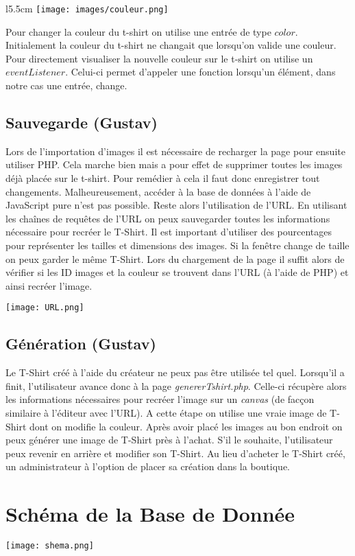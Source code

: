 \documentclass[french]{article}
\begin{document}
\begin{wrapfigure}{l}{5.5cm}
\texttt{[image: images/couleur.png]}
\end{wrapfigure} 

Pour changer la couleur du t-shirt on utilise une entrée de type $color$. Initialement la couleur du t-shirt ne changait que lorsqu'on valide une couleur. Pour directement visualiser la nouvelle couleur sur le t-shirt on utilise un $eventListener$. Celui-ci permet d'appeler une fonction lorsqu'un élément, dans notre cas une entrée, change.

\clearpage
\newpage

\subsection{Sauvegarde (Gustav)}

Lors de l'importation d'images il est nécessaire de recharger la page pour ensuite utiliser PHP. Cela marche bien mais a pour effet de supprimer toutes les images déjà placée sur le t-shirt. Pour remédier à cela il faut donc enregistrer tout changements. Malheureusement, accéder à la base de données à l'aide de JavaScript pure n'est pas possible. Reste alors l'utilisation de l'URL. En utilisant les cha\^{i}nes de requ\^{e}tes de l'URL on peux sauvegarder toutes les informations n\'{e}cessaire pour recr\'{e}er le T-Shirt. Il est important d'utiliser des pourcentages pour repr\'{e}senter les tailles et dimensions des images. Si la fen\^{e}tre change de taille on peux garder le m\^{e}me T-Shirt. Lors du chargement de la page il suffit alors de vérifier si les ID images et la couleur se trouvent dans l'URL (\`{a} l'aide de PHP) et ainsi recréer l'image.

\begin{center}
    \texttt{[image: URL.png]}
\end{center}

\subsection{G\'{e}n\'{e}ration (Gustav)}

Le T-Shirt créé à l'aide du créateur ne peux pas être utilisée tel quel. Lorsqu'il a finit, l'utilisateur avance donc à la page \textit{genererTshirt.php}. Celle-ci r\'{e}cup\`{e}re alors les informations n\'{e}cessaires pour recr\'{e}er l'image sur un \textit{canvas} (de fac\c{c}on similaire \`{a} l'\'{e}diteur avec l'URL). A cette \'{e}tape on utilise une vraie image de T-Shirt dont on modifie la couleur. Apr\`{e}s avoir plac\'{e} les images au bon endroit on peux g\'{e}n\'{e}rer une image de T-Shirt pr\`{e}s \`{a} l'achat. S'il le souhaite, l'utilisateur peux revenir en arri\`{e}re et modifier son T-Shirt. Au lieu d'acheter le T-Shirt cr\'{e}\'{e}, un administrateur \`{a} l'option de placer sa cr\'{e}ation dans la boutique.

\section{Schéma de la Base de Donnée}

\begin{center}
    \texttt{[image: shema.png]}
\end{center}
\end{document}
